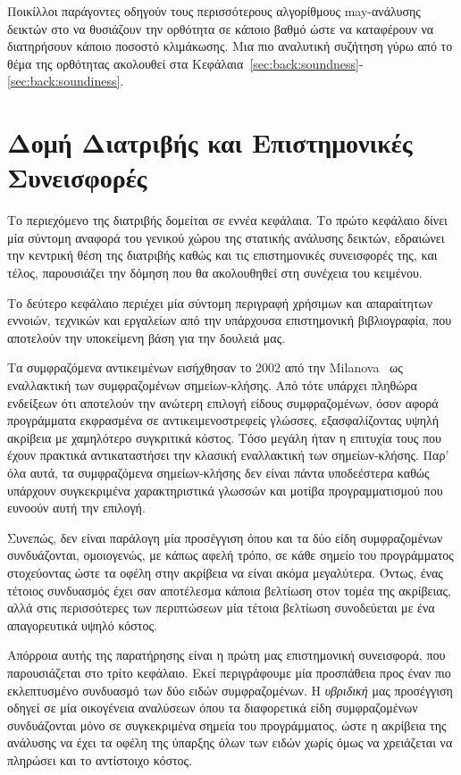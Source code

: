 Ποικίλλοι παράγοντες οδηγούν τους περισσότερους αλγορίθμους {\en may}-ανάλυσης δεικτών στο να θυσιάζουν την ορθότητα σε κάποιο βαθμό ώστε να καταφέρουν να διατηρήσουν κάποιο ποσοστό κλιμάκωσης. Μια πιο αναλυτική συζήτηση γύρω από το θέμα της ορθότητας ακολουθεί στα Κεφάλαια~\ref{sec:back:soundness}-\ref{sec:back:soundiness}.



\section*{Δομή Διατριβής και Επιστημονικές Συνεισφορές}

Το περιεχόμενο της διατριβής δομείται σε εννέα κεφάλαια. Το πρώτο κεφάλαιο δίνει μία σύντομη αναφορά του γενικού χώρου της στατικής ανάλυσης δεικτών, εδραιώνει την κεντρική θέση της διατριβής καθώς και τις επιστημονικές συνεισφορές της, και τέλος, παρουσιάζει την δόμηση που θα ακολουθηθεί στη συνέχεια του κειμένου.

Το δεύτερο κεφάλαιο περιέχει μία σύντομη περιγραφή χρήσιμων και απαραίτητων εννοιών, τεχνικών και εργαλείων από την υπάρχουσα επιστημονική βιβλιογραφία, που αποτελούν την υποκείμενη βάση για την δουλειά μας.


Τα συμφραζόμενα αντικειμένων εισήχθησαν το 2002 από την {\en Milanova}~\cite{issta:2002:Milanova} ως εναλλακτική των συμφραζομένων σημείων-κλήσης. Από τότε υπάρχει πληθώρα ενδείξεων ότι αποτελούν την ανώτερη επιλογή είδους συμφραζομένων, όσον αφορά προγράμματα εκφρασμένα σε αντικειμενοστρεφείς γλώσσες, εξασφαλίζοντας υψηλή ακρίβεια με χαμηλότερο συγκριτικά κόστος. Τόσο μεγάλη ήταν η επιτυχία τους που έχουν πρακτικά αντικαταστήσει την κλασική εναλλακτική των σημείων-κλήσης. Παρ' όλα αυτά, τα συμφραζόμενα σημείων-κλήσης δεν είναι πάντα υποδεέστερα καθώς υπάρχουν συγκεκριμένα χαρακτηριστικά γλωσσών και μοτίβα προγραμματισμού που ευνοούν αυτή την επιλογή.

Συνεπώς, δεν είναι παράλογη μία προσέγγιση όπου και τα δύο είδη συμφραζομένων συνδυάζονται, ομοιογενώς, με κάπως αφελή τρόπο, σε κάθε σημείο του προγράμματος στοχεύοντας ώστε τα οφέλη στην ακρίβεια να είναι ακόμα μεγαλύτερα. Όντως, ένας τέτοιος συνδυασμός έχει σαν αποτέλεσμα κάποια βελτίωση στον τομέα της ακρίβειας, αλλά στις περισσότερες των περιπτώσεων μία τέτοια βελτίωση συνοδεύεται με ένα απαγορευτικά υψηλό κόστος.

Απόρροια αυτής της παρατήρησης είναι η πρώτη μας επιστημονική συνεισφορά, που παρουσιάζεται στο τρίτο κεφάλαιο. Εκεί περιγράφουμε μία προσπάθεια προς έναν πιο εκλεπτυσμένο συνδυασμό των δύο ειδών συμφραζομένων. Η \emph{υβριδική} μας προσέγγιση οδηγεί σε μία οικογένεια αναλύσεων όπου τα διαφορετικά είδη συμφραζομένων συνδυάζονται μόνο σε συγκεκριμένα σημεία του προγράμματος, ώστε η ακρίβεια της ανάλυσης να έχει τα οφέλη της ύπαρξης όλων των ειδών χωρίς όμως να χρειάζεται να πληρώσει και το αντίστοιχο κόστος.

